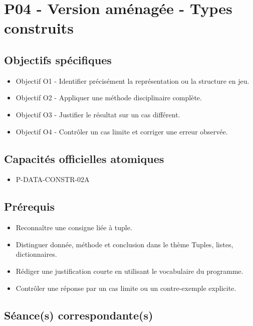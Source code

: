 \section{P04 - Version aménagée - Types construits}

\subsection{Objectifs spécifiques}

\begin{itemize}
\tightlist
\item
  Objectif O1 - Identifier précisément la représentation ou la structure
  en jeu.
\item
  Objectif O2 - Appliquer une méthode disciplinaire complète.
\item
  Objectif O3 - Justifier le résultat sur un cas différent.
\item
  Objectif O4 - Contrôler un cas limite et corriger une erreur observée.
\end{itemize}

\subsection{Capacités officielles atomiques}

\begin{itemize}
\tightlist
\item
  P-DATA-CONSTR-02A
\end{itemize}

\subsection{Prérequis}

\begin{itemize}
\tightlist
\item
  Reconnaître une consigne liée à tuple.
\item
  Distinguer donnée, méthode et conclusion dans le thème Tuples, listes,
  dictionnaires.
\item
  Rédiger une justification courte en utilisant le vocabulaire du
  programme.
\item
  Contrôler une réponse par un cas limite ou un contre-exemple
  explicite.
\end{itemize}

\subsection{Séance(s) correspondante(s)}

